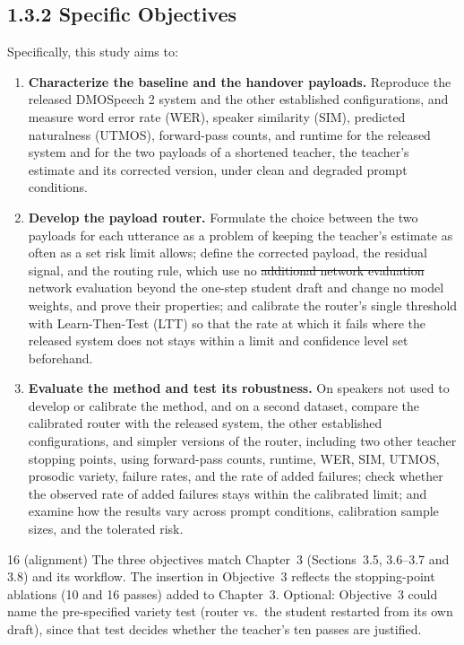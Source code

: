 \documentclass[11pt,a4paper]{article}
\newcommand{\chg}[2]{{\color{delcol}\sout{#1}}\,{\color{addcol}#2}}
\newcommand{\add}[1]{{\color{addcol}#1}}
\newcounter{cmt}
\begin{document}
\subsection*{1.3.2 Specific Objectives}
Specifically, this study aims to:
\begin{enumerate}
\item \textbf{Characterize the baseline and the handover payloads.} Reproduce the released DMOSpeech 2 system and the other established configurations, and measure word error rate (WER), speaker similarity (SIM), predicted naturalness (UTMOS), forward-pass counts, and runtime for the released system and for the two payloads of a shortened teacher, the teacher's estimate and its corrected version, under clean and degraded prompt conditions.
\item \textbf{Develop the payload router.} Formulate the choice between the two payloads for each utterance as a problem of keeping the teacher's estimate as often as a set risk limit allows; define the corrected payload, the residual signal, and the routing rule, which use no \chg{additional network evaluation}{network evaluation beyond the one-step student draft} and change no model weights, and prove their properties; and calibrate the router's single threshold with Learn-Then-Test (LTT) so that the rate at which it fails where the released system does not stays within a limit and confidence level set beforehand.
\item \textbf{Evaluate the method and test its robustness.} On speakers not used to develop or calibrate the method, and on a second dataset, compare the calibrated router with the released system, the other established configurations, and simpler versions of the router\add{, including two other teacher stopping points}, using forward-pass counts, runtime, WER, SIM, UTMOS, prosodic variety, failure rates, and the rate of added failures; check whether the observed rate of added failures stays within the calibrated limit; and examine how the results vary across prompt conditions, calibration sample sizes, and the tolerated risk.
\end{enumerate}

\begin{cmt}{16 (alignment)}
The three objectives match Chapter~3 (Sections~3.5, 3.6--3.7 and 3.8) and its workflow. The insertion in Objective~3 reflects the stopping-point ablations (10 and 16 passes) added to Chapter~3. Optional: Objective~3 could name the pre-specified variety test (router vs.\ the student restarted from its own draft), since that test decides whether the teacher's ten passes are justified.
\end{cmt}
\end{document}
